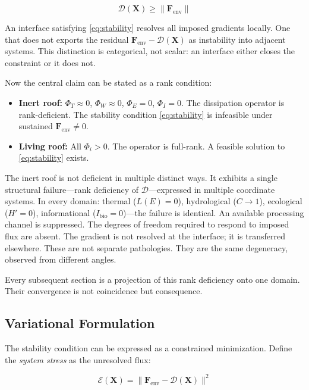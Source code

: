\documentclass[12pt, a4paper]{article}
\theoremstyle{plain}
\theoremstyle{remark}
\begin{document}
\begin{equation}
  \mathcal{D}(\mathbf{X}) \geq \|\mathbf{F}_{\text{env}}\|
  \label{eq:stability}
\end{equation}

\noindent An interface satisfying \eqref{eq:stability} resolves all imposed gradients locally. One that does not exports the residual $\mathbf{F}_{\text{env}} - \mathcal{D}(\mathbf{X})$ as instability into adjacent systems. This distinction is categorical, not scalar: an interface either closes the constraint or it does not.

Now the central claim can be stated as a rank condition:

\begin{itemize}[leftmargin=2em]
  \item \textbf{Inert roof:} $\Phi_T \approx 0$, $\Phi_W \approx 0$, $\Phi_E = 0$, $\Phi_I = 0$. The dissipation operator is rank-deficient. The stability condition \eqref{eq:stability} is infeasible under sustained $\mathbf{F}_{\text{env}} \neq 0$.
  \item \textbf{Living roof:} All $\Phi_i > 0$. The operator is full-rank. A feasible solution to \eqref{eq:stability} exists.
\end{itemize}

\noindent The inert roof is not deficient in multiple distinct ways. It exhibits a single structural failure---rank deficiency of $\mathcal{D}$---expressed in multiple coordinate systems. In every domain: thermal ($L(E)=0$), hydrological ($C\to 1$), ecological ($H'=0$), informational ($I_{\text{bio}}=0$)---the failure is identical. An available processing channel is suppressed. The degrees of freedom required to respond to imposed flux are absent. The gradient is not resolved at the interface; it is transferred elsewhere. These are not separate pathologies. They are the same degeneracy, observed from different angles.

Every subsequent section is a projection of this rank deficiency onto one domain. Their convergence is not coincidence but consequence.

\subsection{Variational Formulation}

The stability condition can be expressed as a constrained minimization. Define the \emph{system stress} as the unresolved flux:

\begin{equation}
  \mathcal{E}(\mathbf{X}) = \bigl\|\mathbf{F}_{\text{env}} - \mathcal{D}(\mathbf{X})\bigr\|^2
  \label{eq:stress}
\end{equation}
\end{document}
